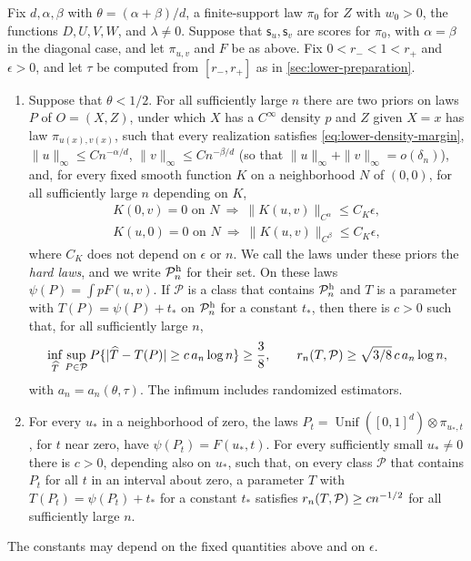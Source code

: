 \begin{proposition}\label{prop:local-lower}
Fix $d,\alpha,\beta$ with $\theta=(\alpha+\beta)/d$, a finite-support
law $\pi_0$ for $Z$ with $w_0>0$, the functions $D,U,V,W$, and
$\lambda\ne0$. Suppose that $\mathsf s_u,\mathsf s_v$ are scores for
$\pi_0$, with $\alpha=\beta$ in the diagonal case, and let $\pi_{u,v}$
and $F$ be as above. Fix $0<r_-<1<r_+$ and $\epsilon>0$, and let $\tau$
be computed from $[r_-,r_+]$ as in \cref{sec:lower-preparation}.
\begin{enumerate}
\item[(a)] Suppose that $\theta<1/2$. For all sufficiently large $n$
there are two priors on laws $P$ of $O=(X,Z)$, under which $X$ has a
$C^\infty$ density $p$ and $Z$ given $X=x$ has law
$\pi_{u(x),v(x)}$, such that every realization satisfies
\eqref{eq:lower-density-margin}, $\|u\|_\infty\le Cn^{-\alpha/d}$,
$\|v\|_\infty\le Cn^{-\beta/d}$ (so that
$\|u\|_\infty+\|v\|_\infty=o(\delta_n)$), and, for every fixed smooth
function $K$ on a neighborhood $N$ of $(0,0)$, for all sufficiently
large $n$ depending on $K$,
\begin{equation}\label{eq:generic-angular-ratio-split}
 \begin{gathered}
 K(0,v)=0\text{ on }N\ \Longrightarrow\
     \|K(u,v)\|_{C^\alpha}\le C_K\epsilon,\\
 K(u,0)=0\text{ on }N\ \Longrightarrow\
     \|K(u,v)\|_{C^\beta}\le C_K\epsilon,
 \end{gathered}
\end{equation}
where $C_K$ does not depend on $\epsilon$ or $n$. We call the laws
under these priors the \emph{hard laws}, and we write $\mathcal P^{\rm h}_n$
for their set. On these laws $\psi(P)=\int pF(u,v)$. If $\mathcal P$ is
a class that contains $\mathcal P^{\rm h}_n$ and $T$ is a parameter with
$T(P)=\psi(P)+t_*$ on $\mathcal P^{\rm h}_n$ for a constant $t_*$, then
there is $c>0$ such that, for all sufficiently large $n$,
\[
 \inf_{\widehat T}\sup_{P\in\mathcal P}
 P\{|\widehat T-T(P)|\ge c\,a_n\log n\}\ge\frac38,
 \qquad r_n(T,\mathcal P)\ge\sqrt{3/8}\,c\,a_n\log n,
\]
with $a_n=a_n(\theta,\tau)$. The infimum includes randomized
estimators.
\item[(b)] For every $u_*$ in a neighborhood of zero, the laws
$P_t=\operatorname{Unif}([0,1]^d)\otimes\pi_{u_*,t}$, for $t$ near
zero, have $\psi(P_t)=F(u_*,t)$. For every sufficiently small
$u_*\ne0$ there is $c>0$, depending also on $u_*$, such that, on every
class $\mathcal P$ that contains $P_t$ for all $t$ in an interval about
zero, a parameter $T$ with $T(P_t)=\psi(P_t)+t_*$ for a constant $t_*$
satisfies $r_n(T,\mathcal P)\ge cn^{-1/2}$ for all sufficiently large
$n$.
\end{enumerate}
The constants may depend on the fixed quantities above and on $\epsilon$.
\end{proposition}

